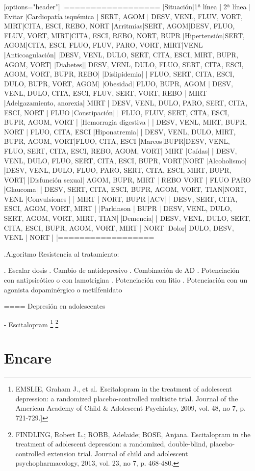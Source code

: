 \documentclass{scrbook}
\begin{document}
[options="header"]
|==================
|Situación|1ª línea | 2ª línea | Evitar
|Cardiopatía isquémica | SERT, AGOM | DESV, VENL, FLUV, VORT, MIRT|CITA, ESCI, REBO, NORT
|Arritmias|SERT, AGOM|DESV, FLUO, FLUV, VORT, MIRT|CITA, ESCI, REBO, NORT, BUPR
|Hipertensión|SERT, AGOM|CITA, ESCI, FLUO, FLUV, PARO, VORT, MIRT|VENL
|Anticoagulación| |DESV, VENL, DULO, SERT, CITA, ESCI, MIRT, BUPR, AGOM, VORT|
|Diabetes|| DESV, VENL, DULO, FLUO, SERT, CITA, ESCI, AGOM, VORT, BUPR, REBO|
|Dislipidemia| | FLUO, SERT, CITA, ESCI, DULO, BUPR, VORT, AGOM|
|Obesidad| FLUO, BUPR, AGOM | DESV, VENL, DULO, CITA, ESCI, FLUV, SERT, VORT, REBO | MIRT
|Adelgazamiento, anorexia| MIRT | DESV, VENL, DULO, PARO, SERT, CITA, ESCI, NORT | FLUO
|Constipación| | FLUO, FLUV, SERT, CITA, ESCI, BUPR, AGOM, VORT |
|Hemorragia digestiva | | DESV, VENL, MIRT, BUPR, NORT | FLUO, CITA, ESCI
|Hiponatremia| | DESV, VENL, DULO, MIRT, BUPR, AGOM, VORT|FLUO, CITA, ESCI
|Mareos|BUPR|DESV, VENL, FLUO, SERT, CITA, ESCI, REBO, AGOM, VORT| MIRT
|Caídas| | DESV, VENL, DULO, FLUO, SERT, CITA, ESCI, BUPR, VORT|NORT
|Alcoholismo| |DESV, VENL, DULO, FLUO, PARO, SERT, CITA, ESCI, MIRT, BUPR, VORT|
|Disfunción sexual| AGOM, BUPR, MIRT | REBO VORT | FLUO PARO
|Glaucoma| | DESV, SERT, CITA, ESCI, BUPR, AGOM, VORT, TIAN|NORT, VENL
|Convulsiones | | MIRT | NORT, BUPR
|ACV| | DESV, SERT, CITA, ESCI, AGOM, VORT, MIRT |
|Parkinson | BUPR | DESV, VENL, DULO, SERT, AGOM, VORT, MIRT, TIAN|
|Demencia| | DESV, VENL, DULO, SERT, CITA, ESCI, BUPR, AGOM, VORT, MIRT | NORT
|Dolor| DULO, DESV, VENL | NORT |
|==================

.Algoritmo
Resistencia al tratamiento:

. Escalar dosis
. Cambio de antidepresivo
. Combinación de AD
. Potenciación con antipsicótico o con lamotrigina
. Potenciación con litio
. Potenciación con un agonista dopaminérgico o metilfenidato

==== Depresión en adolescentes

- Escitalopram \footnote{EMSLIE, Graham J., et al. Escitalopram in the treatment of adolescent depression: a randomized placebo-controlled multisite trial. Journal of the American Academy of Child \& Adolescent Psychiatry, 2009, vol. 48, no 7, p. 721-729.]} \footnote{FINDLING, Robert L.; ROBB, Adelaide; BOSE, Anjana. Escitalopram in the treatment of adolescent depression: a randomized, double-blind, placebo-controlled extension trial. Journal of child and adolescent psychopharmacology, 2013, vol. 23, no 7, p. 468-480.}
\section*{Encare}
\end{document}
